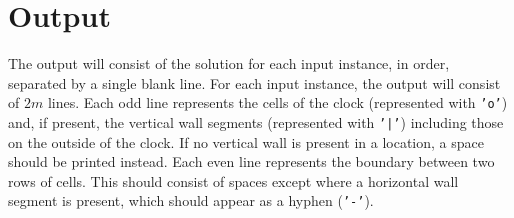 \section*{Output}
  The output will consist of the solution for each input instance, in
  order, separated by a single blank line.  For each input instance,
  the output will consist of $2m$ lines.  Each odd line represents the
  cells of the clock (represented with {\tt 'o'}) and, if present,
  the vertical wall segments (represented with {\tt '|'}) including
  those on the outside of the clock.  If no vertical wall is present
  in a location, a space should be printed instead.  Each even line
  represents the boundary between two rows of cells.  This should
  consist of spaces except where a horizontal wall segment is present,
  which should appear as a hyphen ({\tt '-'}).
